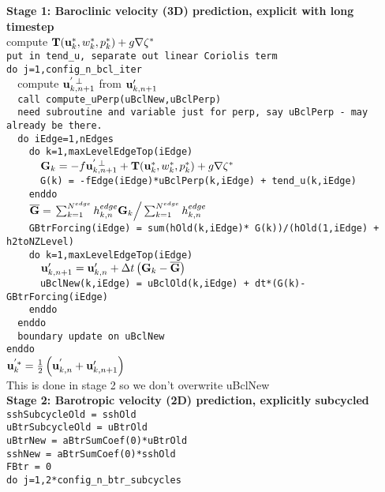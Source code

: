 \documentclass[11pt]{report}
\begin{document}
{\bf Stage 1: Baroclinic velocity (3D) prediction, explicit with long timestep}\\
compute ${\bf T}({\bf u}_k^*,w_k^*,p_k^*) +g\nabla \zeta^* $\\
\verb|put in tend_u, separate out linear Coriolis term|\\
\verb|do j=1,config_n_bcl_iter|\\
\verb|  |compute ${\bf u}_{k,n+1}^{'\;\perp}$ from ${\bf u}_{k,n+1}'$\\
\verb|  call compute_uPerp(uBclNew,uBclPerp)|\\
\verb|  need subroutine and variable just for perp, say uBclPerp - may already be there.|\\
\verb|  do iEdge=1,nEdges|\\
\verb|    do k=1,maxLevelEdgeTop(iEdge)|\\
\verb|      |${\bf G}_k = -f{\bf u}_{k,n+1}^{'\;\perp} + {\bf T}({\bf u}_k^*,w_k^*,p_k^*) 
+g\nabla \zeta^*$\\
\verb|      G(k) = -fEdge(iEdge)*uBclPerp(k,iEdge) + tend_u(k,iEdge)|\\
\verb|    enddo|\\
\verb|    |${\overline {\bf G}} = 
\left. \sum_{k=1}^{N^{edge}} h_{k,n}^{edge} {\bf G}_k 
\right/\sum_{k=1}^{N^{edge}} h_{k,n}^{edge}
$\\
\verb|    GBtrForcing(iEdge) = sum(hOld(k,iEdge)* G(k))/(hOld(1,iEdge) + h2toNZLevel)|\\
\verb|    do k=1,maxLevelEdgeTop(iEdge)|\\
\verb|      |${\bf u}'_{k,n+1} = {\bf u}'_{k,n} + \Delta t \left({\bf G}_k - {\overline {\bf G}}
\right)$\\
\verb|      uBclNew(k,iEdge) = uBclOld(k,iEdge) + dt*(G(k)-GBtrForcing(iEdge)|\\
\verb|    enddo|\\
\verb|  enddo|\\
\verb|  boundary update on uBclNew|\\
\verb|enddo|\\
${\bf u}^{'*}_k = \frac{1}{2}\left({\bf u}^{'}_{k,n} +{\bf u}'_{k,n+1}\right) $\\
This is done in stage 2 so we don't overwrite uBclNew\\

\newpage
{\bf Stage 2: Barotropic velocity (2D) prediction, explicitly subcycled}\\
\verb|sshSubcycleOld = sshOld  |\\
\verb|uBtrSubcycleOld = uBtrOld |\\
\verb|uBtrNew = aBtrSumCoef(0)*uBtrOld  |\\
\verb|sshNew = aBtrSumCoef(0)*sshOld  |\\
\verb|FBtr = 0  |\\
\verb|do j=1,2*config_n_btr_subcycles|\\
\end{document}
